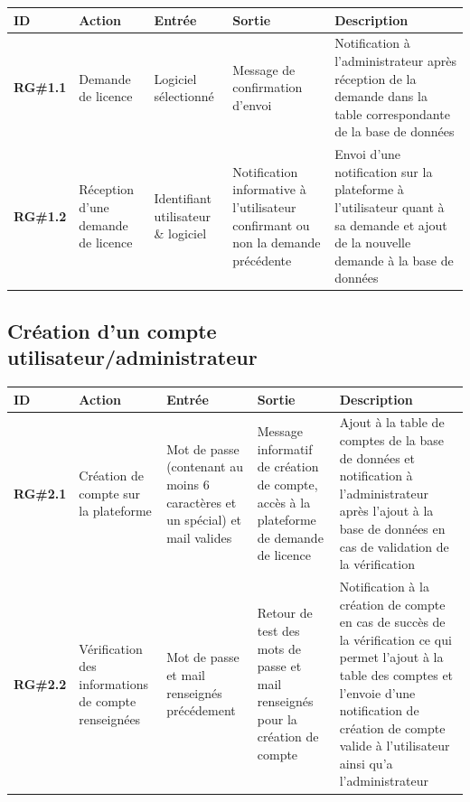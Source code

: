 \begin{table}[!h] %
    \small
    \begin{tabular}{|m{1.5cm}|m{1.9cm}|m{2.5cm}|m{2.5cm}|m{7cm}|}
	\hline
	    \textbf{ID} & \textbf{Action} & \textbf{Entrée} & \textbf{Sortie} & \textbf{Description} \\
	\hline
	    \textbf{RG\#1.1} & Demande de licence & Logiciel sélectionné & Message de confirmation  d'envoi & Notification à l'administrateur après réception de la demande dans la table correspondante de la base de données \\
	\hline
	    \textbf{RG\#1.2} & Réception d'une  demande de  licence & Identifiant utilisateur \& logiciel & Notification informative à l'utilisateur  confirmant ou  non la demande  précédente & Envoi d'une notification sur la plateforme à l'utilisateur quant à sa demande et ajout de la nouvelle demande à la base de données\\
	\hline
    \end{tabular}
\end{table} 
	
\subsection{Création d'un compte utilisateur/administrateur}

\begin{table}[!h] %
    \small
    \begin{tabular}{|m{1.5cm}|m{1.9cm}|m{2.5cm}|m{2.5cm}|m{7cm}|} 
	\hline
	    \textbf{ID} & \textbf{Action} & \textbf{Entrée} & \textbf{Sortie} & \textbf{Description} \\
	\hline
	    \textbf{RG\#2.1} & Création de compte sur la  plateforme & Mot de passe (contenant au moins 6 caractères et un spécial) et mail valides & Message informatif de création de compte, accès à la plateforme de demande de licence& Ajout à la table de comptes de la base de données et notification à l'administrateur après l'ajout à la base de données en cas de validation de la vérification\\
	\hline
	    \textbf{RG\#2.2} & Vérification des informations de  compte renseignées & Mot de passe et mail renseignés précédement & Retour de test des mots de passe et mail renseignés pour la création de compte& Notification à la création de compte en cas de succès de la vérification ce qui permet l'ajout à la table des comptes et l'envoie d'une notification de création de compte valide à l'utilisateur ainsi qu'a l'administrateur\\
	\hline
    \end{tabular}
\end{table}

